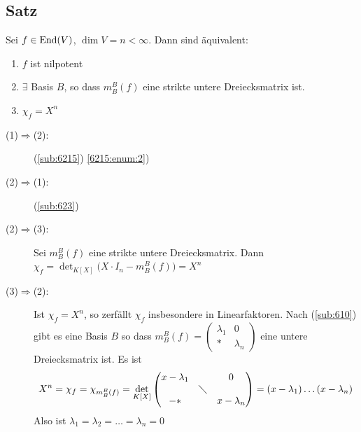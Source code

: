 \subsection[Satz: äquivalente Aussagen über nilpotente Endomorphismen]{Satz} %
\label{sub:624}
Sei $f \in \operatorname{End}(V)$, $\dim V=n < \infty$. Dann sind äquivalent:
\begin{enumerate}[(1)]
	\item $f$ ist nilpotent
	\item $\exists$ Basis $B$, so dass $m_B^B(f)$ eine strikte untere Dreiecksmatrix ist.
	\item $\chi_f = X^n$
\end{enumerate}
\begin{description}
	\item[(1)$\Rightarrow$(2):] (\ref{sub:6215}) \ref{6215:enum:2})
	\item[(2)$\Rightarrow$(1):] (\ref{sub:623})
	\item[(2)$\Rightarrow$(3):] Sei $m_B^B(f)$  eine strikte untere Dreiecksmatrix. Dann $\chi_f = \det_{K[X]} \big(X \cdot I_n - m_B^B(f)\big)= X^n$
	\item[(3)$\Rightarrow$(2):] Ist $\chi_f= X^n$, so zerfällt $\chi_f$ insbesondere in Linearfaktoren.
	Nach (\ref{sub:610}) gibt es eine Basis $B$ so dass $m_B^B(f)= \left(\begin{smallmatrix}
		\lambda_1 & 0 \\
		* & \lambda_n
	\end{smallmatrix}\right)$ eine untere Dreiecksmatrix ist. Es ist 
	\[
		X^n = \chi_f = \chi_{m_B^B(f)} = \det_{K[X]} \begin{pmatrix}
			x- \lambda_1 & & 0 \\
			& \diagdown & \\
			-* & & x- \lambda_n
		\end{pmatrix} = (x- \lambda_1) \ldots (x- \lambda_n)
	\]
	Also ist $\lambda_1 = \lambda_2 = \ldots = \lambda_n = 0  $ \bewende
\end{description}


